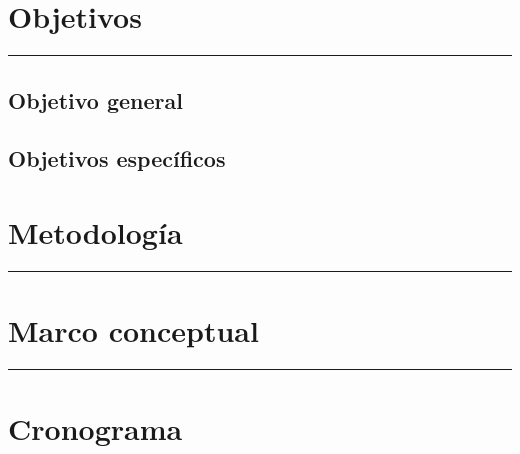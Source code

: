\documentclass[12pt,twoside]{article}
\begin{document}
\newpage
\section{Objetivos}
\vspace*{0.08\baselineskip}
\hrule
\vspace*{0.7\baselineskip}
\subsection{Objetivo general}

\subsection{Objetivos específicos}




\newpage
\section{Metodología}
\vspace*{0.2\baselineskip}
\hrule
\vspace*{0.7\baselineskip}

\newpage


\section{Marco conceptual}
\vspace*{0.2\baselineskip}
\hrule
\vspace*{0.7\baselineskip}



\newpage
\section{Cronograma}

\newpage

\nocite{*}

\end{document}
